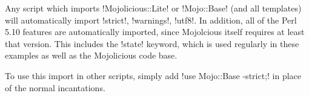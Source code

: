 Any script which imports \lstperl!Mojolicious::Lite! or \lstperl!Mojo::Base! (and all templates) will automatically import 
\lstperl!strict!, \lstperl!warnings!, \lstperl!utf8!.
In addition, all of the Perl 5.10 features are automatically imported, since Mojolcious itself requires at least that version.
This includes the \lstperl!state! keyword, which is used regularly in these examples as well as the Mojolicious code base.

To use this import in other scripts, simply add \lstperl!use Mojo::Base -strict;! in place of the normal incantations.
